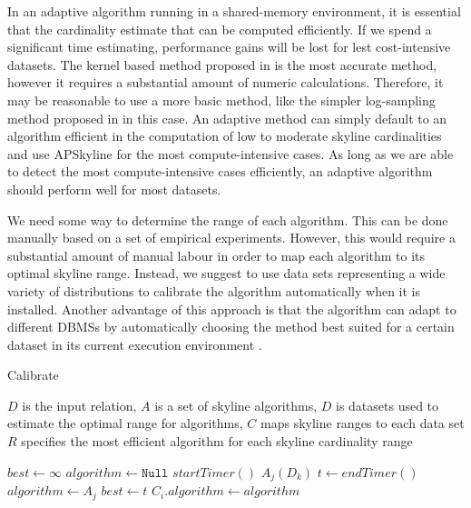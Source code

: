 \documentclass[12pt,a4paper,twoside]{report}
\begin{document}
In an adaptive algorithm running in a shared-memory environment, it is
essential that the cardinality estimate that can be computed
efficiently. If we spend a significant time estimating, performance
gains will be lost for lest cost-intensive datasets. The kernel based
method proposed in \cite{zhang2009kernel} is the most accurate method,
however it requires a substantial amount of numeric calculations.
Therefore, it may be reasonable to use a more basic method, like the
simpler log-sampling method proposed in \cite{chaudhuri2006robust} in
this case. An adaptive method can simply default to an algorithm
efficient in the computation of low to moderate skyline cardinalities
and use APSkyline for the most compute-intensive cases. As long as we
are able to detect the most compute-intensive cases efficiently, an
adaptive algorithm should perform well for most datasets.

We need some way to determine the range of each algorithm. This can
be done manually based on a set of empirical experiments.  However,
this would require a substantial amount of manual labour in order to
map each algorithm to its optimal skyline range. Instead, we suggest
to use data sets representing a wide variety of distributions to
calibrate the algorithm automatically when it is installed. Another
advantage of this approach is that the algorithm can adapt to
different DBMSs by automatically choosing the method best suited for a
certain dataset in its current execution environment
\cite{frigo1998fftw}. 

\begin{algorithm}[H]
	\caption{Calibrate}
	\label{alg:calibrate}
	\begin{algorithmic}
		\Require $D$ is the input relation,
			$A$ is a set of skyline algorithms,
			$D$ is datasets used to estimate the
			optimal range for algorithms,
			$C$ maps skyline ranges to each data set
		\Ensure $R$ specifies the most efficient algorithm for each
		skyline cardinality range 

			\State $best \leftarrow \infty$
			\State $algorithm \leftarrow \texttt{Null}$
				\State $startTimer()$
					\State $A_j(D_k)$
				\EndFor
				\State $t \leftarrow endTimer()$
					\State $algorithm \leftarrow A_j$
					\State $best \leftarrow t$
				\EndIf
			\EndFor
			\State $C_i.algorithm \leftarrow algorithm$
		\EndFor
   \end{algorithmic}
\end{algorithm}
\end{document}
